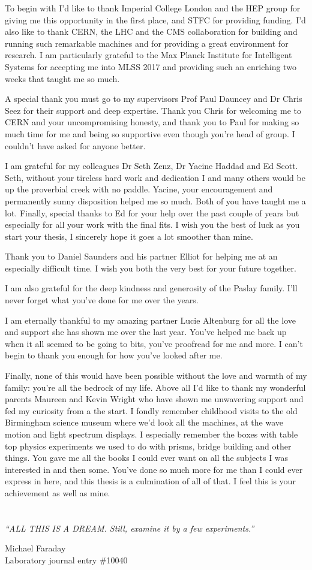 To begin with I'd like to thank Imperial College London and the HEP group for giving me this opportunity in the first place, and STFC for providing funding.
I'd also like to thank CERN, the LHC and the CMS collaboration for building and running such remarkable machines and for providing a great environment for research.
I am particularly grateful to the Max Planck Institute for Intelligent Systems for accepting me into MLSS 2017 and providing such an enriching two weeks that taught me so much. 

A special thank you must go to my supervisors Prof Paul Dauncey and Dr Chris Seez for their support and deep expertise.
Thank you Chris for welcoming me to CERN and your uncompromising honesty, and thank you to Paul for making so much time for me and being so supportive even though you're head of group. I couldn't have asked for anyone better.

I am grateful for my colleagues Dr Seth Zenz, Dr Yacine Haddad and Ed Scott. 
Seth, without your tireless hard work and dedication I and many others would be up the proverbial creek with no paddle.
Yacine, your encouragement and permanently sunny disposition helped me so much. Both of you have taught me a lot. 
Finally, special thanks to Ed for your help over the past couple of years but especially for all your work with the final fits. 
I wish you the best of luck as you start your thesis, I sincerely hope it goes a lot smoother than mine. 

Thank you to Daniel Saunders and his partner Elliot for helping me at an especially difficult time.
I wish you both the very best for your future together.

I am also grateful for the deep kindness and generosity of the Paslay family. 
I'll never forget what you've done for me over the years. 

I am eternally thankful to my amazing partner Lucie Altenburg for all the love and support she has shown me over the last year. 
You've helped me back up when it all seemed to be going to bits, you've proofread for me and more. 
I can't begin to thank you enough for how you've looked after me. 

Finally, none of this would have been possible without the love and warmth of my family: you're all the bedrock of my life.
Above all I'd like to thank my wonderful parents Maureen and Kevin Wright who have shown me unwavering support and fed my curiosity from a the start.
I fondly remember childhood visits to the old Birmingham science museum where we'd look all the machines, at the wave motion and light spectrum displays.
I especially remember the boxes with table top physics experiments we used to do with prisms, bridge building and other things. 
You gave me all the books I could ever want on all the subjects I was interested in and then some. 
You've done so much more for me than I could ever express in here, and this thesis is a culmination of all of that. 
I feel this is your achievement as well as mine. 

\tableofcontents
\listoffigures
\listoftables
%
\chapter*{\centering }
\begin{center}
\epigraph{\textit{``ALL THIS IS A DREAM. Still, examine it by a few experiments.''}}{Michael Faraday\\ Laboratory journal entry \#10040}
\end{center}

\cleardoublepage

